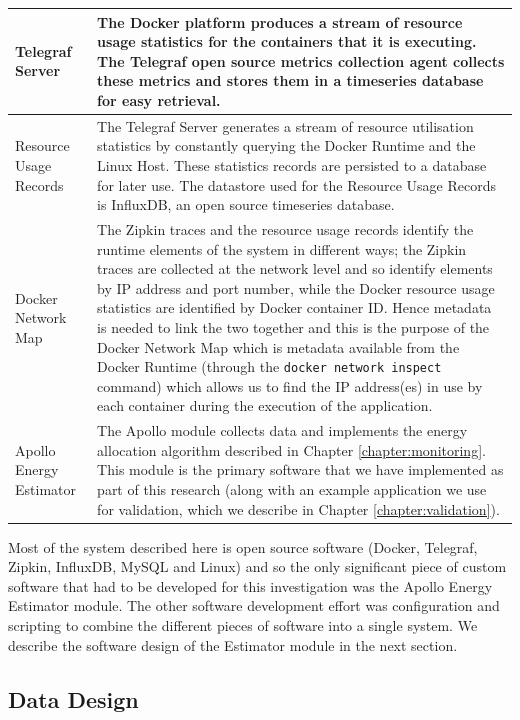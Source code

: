 \begin{table}
\begin{tabular}{|l|p{10cm}|}
\hline
Telegraf Server & The Docker platform produces a stream of resource usage statistics for the containers that it is executing.  The Telegraf open source metrics collection agent collects these metrics and stores them in a timeseries database for easy retrieval. \\
\hline
Resource Usage Records & The Telegraf Server generates a stream of resource utilisation statistics by constantly querying the Docker Runtime and the Linux Host.  These statistics records are persisted to a database for later use.  The datastore used for the Resource Usage Records is InfluxDB, an open source timeseries database. \\
\hline
Docker Network Map & The Zipkin traces and the resource usage records identify the runtime elements of the system in different ways; the Zipkin traces are collected at the network level and so identify elements by IP address and port number, while the Docker resource usage statistics are identified by Docker container ID.  Hence metadata is needed to link the two together and this is the purpose of the Docker Network Map which is metadata available from the Docker Runtime (through the \texttt{docker network inspect} command) which allows us to find the IP address(es) in use by each container during the execution of the application. \\
\hline
Apollo Energy Estimator & The Apollo module collects data and implements the energy allocation algorithm described in Chapter \ref{chapter:monitoring}.  This module is the primary software that we have implemented as part of this research (along with an example application we use for validation, which we describe in Chapter \ref{chapter:validation}). \\
\hline
\end{tabular}
\end{table}

Most of the system described here is open source software (Docker, Telegraf, Zipkin, InfluxDB, MySQL and Linux) and so the only significant piece of custom software that had to be developed for this investigation was the Apollo Energy Estimator module.  The other software development effort was configuration and scripting to combine the different pieces of software into a single system.  We describe the software design of the Estimator module in the next section.

\subsection{Data Design}
\label{subsection:data-design}

